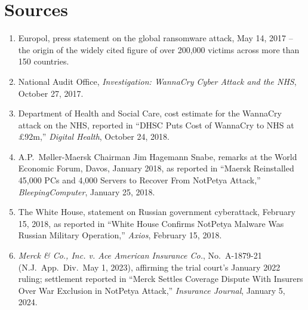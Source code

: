 \section*{Sources}
\begin{enumerate}[label=\lbrack\arabic*\rbrack, leftmargin=2.2em]
\item {}Europol, press statement on the global ransomware attack, May 14, 2017 --
the origin of the widely cited figure of over 200,000 victims across more than 150 countries.
\item {}National Audit Office, \emph{Investigation: WannaCry Cyber Attack and the
NHS}, October 27, 2017.
\item {}Department of Health and Social Care, cost estimate for the WannaCry attack
on the NHS, reported in ``DHSC Puts Cost of WannaCry to NHS at \pounds{}92m,''
\emph{Digital Health}, October 24, 2018.
\item {}A.P.\ M\o{}ller-Maersk Chairman Jim Hagemann Snabe, remarks at the World
Economic Forum, Davos, January 2018, as reported in ``Maersk Reinstalled 45,000 PCs and 4,000
Servers to Recover From NotPetya Attack,'' \emph{BleepingComputer}, January 25, 2018.
\item {}The White House, statement on Russian government cyberattack, February 15,
2018, as reported in ``White House Confirms NotPetya Malware Was Russian Military Operation,''
\emph{Axios}, February 15, 2018.
\item {}\emph{Merck \& Co., Inc. v. Ace American Insurance Co.}, No.\ A-1879-21 (N.J.\
App.\ Div.\ May 1, 2023), affirming the trial court's January 2022 ruling; settlement reported in
``Merck Settles Coverage Dispute With Insurers Over War Exclusion in NotPetya Attack,''
\emph{Insurance Journal}, January 5, 2024.
\end{enumerate}
